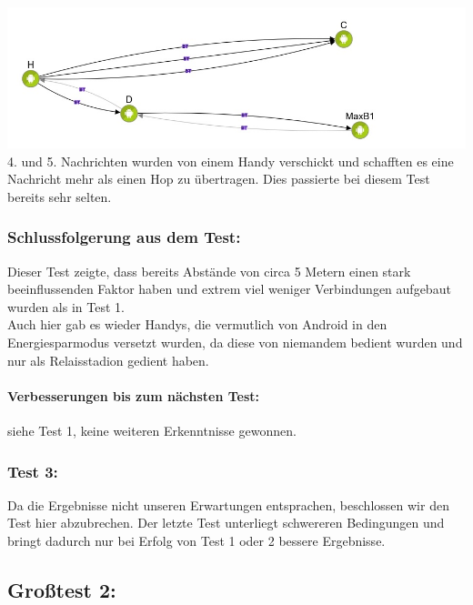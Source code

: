 \includegraphics[width=1.0\textwidth]{belege/grosstests/Bilder/Test2Misserfolg6.jpg}\\ 4. und
5. Nachrichten wurden von einem Handy verschickt und schafften es eine
Nachricht mehr als einen Hop zu übertragen. Dies passierte bei diesem
Test bereits sehr selten.\\

\subsubsection{Schlussfolgerung aus dem
Test:}\label{schlussfolgerung-aus-dem-test-1}

Dieser Test zeigte, dass bereits Abstände von circa 5 Metern einen stark
beeinflussenden Faktor haben und extrem viel weniger Verbindungen
aufgebaut wurden als in Test 1.\\

Auch hier gab es wieder Handys, die vermutlich von Android in den
Energiesparmodus versetzt wurden, da diese von niemandem bedient wurden
und nur als Relaisstadion gedient haben.

\paragraph*{Verbesserungen bis zum nächsten Test:}

siehe Test 1, keine weiteren Erkenntnisse gewonnen.

\subsubsection{Test 3:}\label{test-3}

Da die Ergebnisse nicht unseren Erwartungen entsprachen, beschlossen wir
den Test hier abzubrechen. Der letzte Test unterliegt schwereren
Bedingungen und bringt dadurch nur bei Erfolg von Test 1 oder 2 bessere
Ergebnisse.

\subsection{Großtest 2:}\label{grosstest-2}

